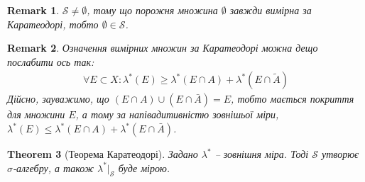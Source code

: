 \documentclass[a4paper, 10pt]{article}
\theoremstyle{theoremdd}
\newtheorem{theorem}{Theorem}[subsection]
\newtheorem{remark}[theorem]{Remark}
\begin{document}
\begin{remark}
$\mathcal{S} \neq \emptyset$, тому що порожня множина $\emptyset$ завжди вимірна за Каратеодорі, тобто $\emptyset \in \mathcal{S}$.
\end{remark}

\begin{remark}
Означення вимірних множин за Каратеодорі можна дещо послабити ось так:
\begin{align*}
\forall E \subset X: \lambda^*(E) \geq \lambda^*(E \cap A) + \lambda^*(E \cap \tilde{A})
\end{align*}
Дійсно, зауважимо, що $(E \cap A) \cup (E \cap \bar{A}) = E$, тобто мається покриття для множини $E$, а тому за напівадитивністю зовнішьої міри,\\
$\lambda^*(E) \leq \lambda^*(E \cap A) + \lambda^*(E \cap \bar{A})$.
\end{remark}

\begin{theorem}[Теорема Каратеодорі]
Задано $\lambda^*$ -- зовнішня міра. Тоді $\mathcal{S}$ утворює $\sigma$-алгебру, а також $\lambda^*|_{\mathcal{S}}$ буде мірою.
\end{theorem}
\end{document}
